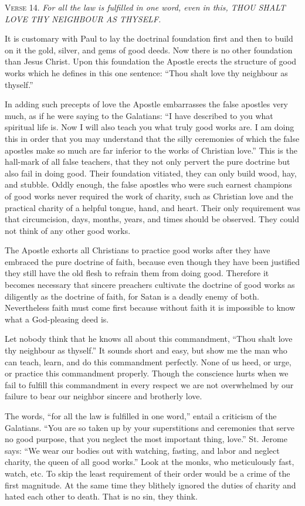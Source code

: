 \textsc{Verse} 14. \emph{For all the law is fulfilled in one word, even in this, THOU SHALT LOVE THY NEIGHBOUR AS THYSELF.}

It is customary with Paul to lay the doctrinal foundation first and then to build on it the gold, silver, and gems of good deeds. Now there is no other foundation than Jesus Christ. Upon this foundation the Apostle erects the structure of good works which he defines in this one sentence: “Thou shalt love thy neighbour as thyself.”

In adding such precepts of love the Apostle embarrasses the false apostles very much, as if he were saying to the Galatians: “I have described to you what spiritual life is. Now I will also teach you what truly good works are. I am doing this in order that you may understand that the silly ceremonies of which the false apostles make so much are far inferior to the works of Christian love.” This is the hall-mark of all false teachers, that they not only pervert the pure doctrine but also fail in doing good. Their foundation vitiated, they can only build wood, hay, and stubble. Oddly enough, the false apostles who were such earnest champions of good works never required the work of charity, such as Christian love and the practical charity of a helpful tongue, hand, and heart. Their only requirement was that circumcision, days, months, years, and times should be observed. They could not think of any other good works.

The Apostle exhorts all Christians to practice good works after they have embraced the pure doctrine of faith, because even though they have been justified they still have the old flesh to refrain them from doing good. Therefore it becomes necessary that sincere preachers cultivate the doctrine of good works as diligently as the doctrine of faith, for Satan is a deadly enemy of both. Nevertheless faith must come first because without faith it is impossible to know what a God-pleasing deed is.

Let nobody think that he knows all about this commandment, “Thou shalt love thy neighbour as thyself.” It sounds short and easy, but show me the man who can teach, learn, and do this commandment perfectly. None of us heed, or urge, or practice this commandment properly. Though the conscience hurts when we fail to fulfill this commandment in every respect we are not overwhelmed by our failure to bear our neighbor sincere and brotherly love.

The words, “for all the law is fulfilled in one word,” entail a criticism of the Galatians. “You are so taken up by your superstitions and ceremonies that serve no good purpose, that you neglect the most important thing, love.” St. Jerome says: “We wear our bodies out with watching, fasting, and labor and neglect charity, the queen of all good works.” Look at the monks, who meticulously fast, watch, etc. To skip the least requirement of their order would be a crime of the first magnitude. At the same time they blithely ignored the duties of charity and hated each other to death. That is no sin, they think.

